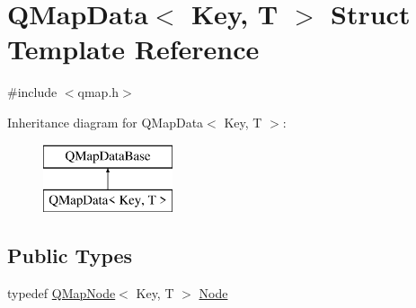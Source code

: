 \hypertarget{struct_q_map_data}{}\section{Q\+Map\+Data$<$ Key, T $>$ Struct Template Reference}
\label{struct_q_map_data}


{\ttfamily \#include $<$qmap.\+h$>$}

Inheritance diagram for Q\+Map\+Data$<$ Key, T $>$\+:\begin{figure}[H]
\begin{center}
\leavevmode
\includegraphics[height=2.000000cm]{struct_q_map_data}
\end{center}
\end{figure}
\subsection*{Public Types}
\begin{DoxyCompactItemize}
\item 
typedef \hyperlink{struct_q_map_node}{Q\+Map\+Node}$<$ Key, T $>$ \hyperlink{struct_q_map_data_a9e453de3cc687c14a51c4145bb5959c3}{Node}
\end{DoxyCompactItemize}
